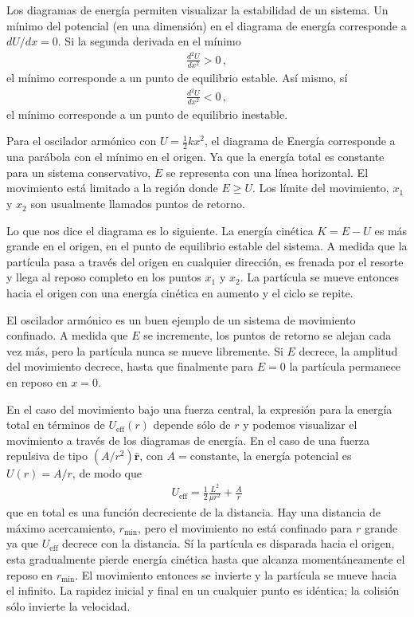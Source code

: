 Los diagramas de energía permiten visualizar la estabilidad de un sistema. Un mínimo del potencial (en una dimensión) en el diagrama de energía corresponde a $dU/dx=0$. Si la segunda derivada en el mínimo
\begin{align}
  \frac{d^2U}{dx^2}>0\,,
\end{align}
el mínimo corresponde a un punto de equilibrio estable. Así mismo, sí
\begin{align}
  \frac{d^2U}{dx^2}<0\,,
\end{align}
el mínimo corresponde a un punto de equilibrio inestable.

Para el oscilador armónico con $U=\frac12 k x^2$, el diagrama de Energía corresponde a una parábola con el mínimo en el origen. Ya que la energía total es constante para un sistema conservativo, $E$ se representa con una línea horizontal. El movimiento está limitado a la región donde $E\ge U$. %
Los límite del movimiento, $x_1$ y $x_2$ %
son usualmente llamados puntos de retorno.

Lo que nos dice el diagrama es lo siguiente. La energía cinética $K=E-U$ es más grande en el origen, en el punto de equilibrio estable del sistema. A medida que la partícula pasa  a través del origen en cualquier dirección, es frenada por el resorte y llega al reposo completo en los puntos $x_1$ y $x_2$. La partícula se mueve entonces hacia el origen con una energía cinética en aumento y el ciclo se repite.

El oscilador armónico es un buen ejemplo de un sistema de movimiento confinado. A medida que $E$ se incremente, los puntos de retorno se alejan cada vez más, pero la partícula nunca se mueve libremente. Si $E$ decrece, la amplitud del movimiento decrece, hasta que finalmente para $E=0$ la partícula permanece en reposo en $x=0$.

En el caso del movimiento bajo una fuerza central, la expresión para la energía total en términos de $U_{\text{eff}}(r)$ depende sólo de $r$ y podemos visualizar el movimiento a través de los diagramas de energía. En el caso de una fuerza repulsiva de tipo $(A/r^2)\hat{\mathbf{r}}$, con $A=\text{constante}$, la energía potencial es $U(r)=A/r$, de modo que
\begin{align}
  U_{\text{eff}}=\frac{1}{2}\frac{L^2}{\mu r^2}+\frac{A}{r} 
\end{align}
que en total es una función decreciente de la distancia. %
Hay una distancia de máximo acercamiento, $r_{\text{min}}$, pero el movimiento no está confinado para $r$ grande ya que $U_{\text{eff}}$ decrece con la distancia. Sí la partícula es disparada hacia el origen, esta gradualmente pierde energía cinética hasta que alcanza momentáneamente el reposo en $r_{\text{min}}$. El movimiento entonces se invierte y la partícula se mueve hacia el infinito. La rapidez inicial y final en un cualquier punto es idéntica; la colisión sólo invierte la velocidad.

